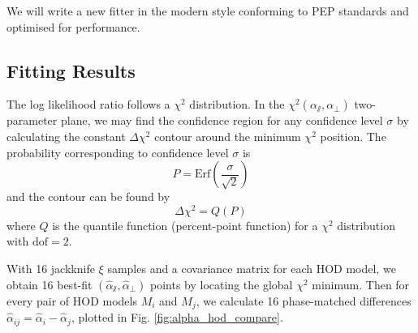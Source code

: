 \documentclass[fleqn,usenatbib]{mnras}
\begin{document}
		We will write a new fitter in the modern style conforming to PEP standards and optimised for performance.
		
	\subsection{Fitting Results}
	
		The log likelihood ratio follows a $\chi^2$ distribution. In the $\chi^2 (\alpha_\varparallel, \alpha_\perp)$ two-parameter plane, we may find the confidence region for any confidence level $\sigma$ by calculating the constant $\Delta\chi^2$ contour around the minimum $\chi^2$ position. The probability corresponding to confidence level $\sigma$ is
		\begin{equation}
			P = \mathrm{Erf} ( \frac{\sigma}{\sqrt{2}} )
		\end{equation}
		and the contour can be found by
		\begin{equation}
			\Delta \chi^2 = Q(P)
		\end{equation}
		where $Q$ is the quantile function (percent-point function) for a $\chi^2$ distribution with $\mathrm{dof}=2$.
		
		With 16 jackknife $\xi$ samples and a covariance matrix for each HOD model, we obtain 16 best-fit $ (\hat{\alpha}_\varparallel, \hat{\alpha}_\perp) $ points by locating the global $\chi^2$ minimum. Then for every pair of HOD models $M_i$ and $M_j$, we calculate 16 phase-matched differences $\hat{\alpha}_{ij} = \hat{\alpha}_i - \hat{\alpha}_j$, plotted in Fig. \ref{fig:alpha_hod_compare}.
		
\end{document}
